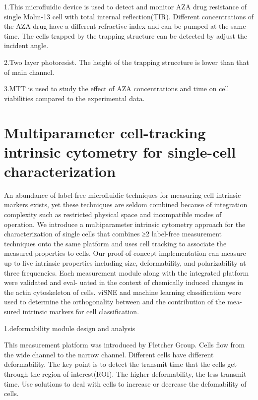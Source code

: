 \documentclass{article}
\begin{document}


1.This microfluidic device is used to detect and monitor AZA drug resistance  of single Molm-13 cell with total internal reflection(TIR). Different concentrations of the AZA drug have a different refractive index and can be pumped at the same time. The cells trapped by the trapping structure can be detected by adjust the incident angle.

2.Two layer photoresist. The height of the trapping struceture is lower than that of main channel.

3.MTT is used to study the effect of AZA concentrations and time on cell viabilities compared to the experimental data. 


\part{Multiparameter cell-tracking intrinsic cytometry for single-cell characterization}

An abundance of label-free microfluidic techniques for measuring cell intrinsic markers exists, yet these techniques are seldom combined because of integration complexity such as restricted physical space and incompatible modes of operation. We introduce a multiparameter intrinsic cytometry approach for the characterization of single cells that combines ≥2 label-free measurement techniques onto the same platform and uses cell tracking to associate the measured properties to cells. Our proof-of-concept implementation can measure up to five intrinsic properties including size, deformability, and polarizability at three frequencies. Each measurement module along with the integrated platform were validated and eval- uated in the context of chemically induced changes in the actin cytoskeleton of cells. viSNE and machine learning classification were used to determine the orthogonality between and the contribution of the mea- sured intrinsic markers for cell classification.

1.deformability module design and analysis

This measurement platform was introduced by Fletcher Group. Cells flow from the wide channel to the narrow channel. Different cells have different deformability. The key point is to detect the transmit time that the cells get through the region of interest(ROI). The higher deformability, the less transmit time. Use solutions to deal with cells to increase or decrease the defomability of cells. 
\end{document}
